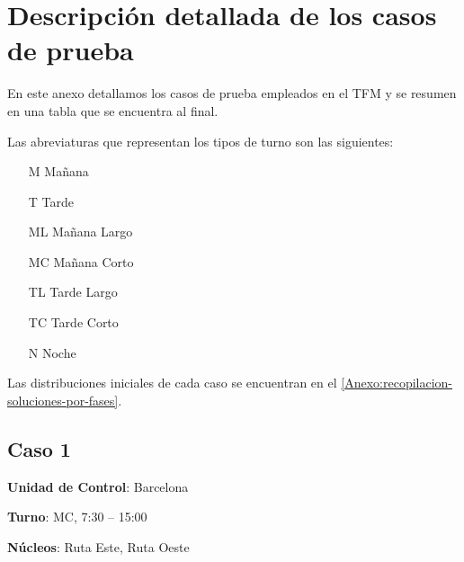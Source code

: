\graphicspath{{anexos/AnexoD-Tabla-Casos/recursos/}}

\section{Descripción detallada de los casos de prueba} \label{Anexo:tabla-casos}
%

En este anexo detallamos los casos de prueba empleados en el TFM y se resumen en una tabla que se encuentra al final.

Las abreviaturas que representan los tipos de turno son las siguientes:

\begin{enumerate}[align=left]
	\item[M] Mañana
	\item[T] Tarde 
	\item[ML] Mañana Largo
	\item[MC] Mañana Corto
	\item[TL] Tarde Largo
	\item[TC] Tarde Corto
	\item[N] Noche
\end{enumerate}

Las distribuciones iniciales de cada caso se encuentran en el \autoref{Anexo:recopilacion-soluciones-por-fases}.

\subsection{Caso 1}

\textbf{Unidad de Control}: Barcelona

\textbf{Turno}: MC, 7:30 -- 15:00

\textbf{Núcleos}: Ruta Este, Ruta Oeste

